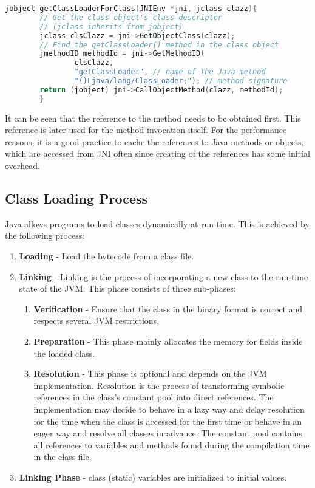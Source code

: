 \begin{lstlisting}[language=c++]
        jobject getClassLoaderForClass(JNIEnv *jni, jclass clazz){
        // Get the class object's class descriptor
        // (jclass inherits from jobject)
        jclass clsClazz = jni->GetObjectClass(clazz);
        // Find the getClassLoader() method in the class object
        jmethodID methodId = jni->GetMethodID(
		        clsClazz,
		        "getClassLoader", // name of the Java method
		        "()Ljava/lang/ClassLoader;"); // method signature
        return (jobject) jni->CallObjectMethod(clazz, methodId);
        }
\end{lstlisting}

It can be seen that the reference to the method needs to be obtained first. This reference is later used for the method invocation itself. For the performance reasons, it is a good practice to cache the references to Java methods or objects, which are accessed from JNI often since creating of the references has some initial overhead.

\subsection{Class Loading Process}
Java allows programs to load classes dynamically at run-time. This is achieved by the following process:
\begin{enumerate}
	\item \textbf{Loading} - Load the bytecode from a class file.
	\item \textbf{Linking} - Linking is the process of incorporating a new class to the run-time state of the JVM. This phase consists of three sub-phases:
	\begin{enumerate}
		\item \textbf{Verification} - Ensure that the class in the binary format is correct and respects several JVM restrictions.
		\item \textbf{Preparation} - This phase mainly allocates the memory for fields inside the loaded class.
		\item \textbf{Resolution} - This phase is optional and depends on the JVM implementation. Resolution is the process of transforming symbolic references in the class's constant pool into direct references. The implementation may decide to behave in a lazy way and delay resolution for the time when the class is accessed for the first time or behave in an eager way and resolve all classes in advance. The constant pool contains all references to variables and methods found during the compilation time in the class file.
	\end{enumerate}
	\item \textbf{Linking Phase} - class (static) variables are initialized to initial values.
\end{enumerate}
